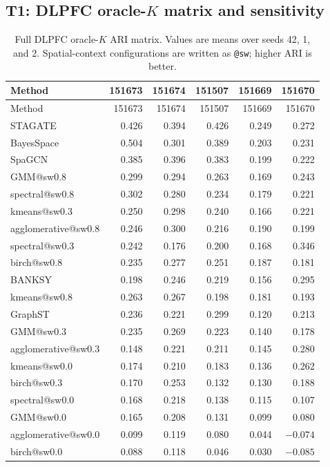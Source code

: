 \documentclass[11pt]{article}
\begin{document}
\subsection{T1: DLPFC oracle-\(K\) matrix and sensitivity}

\begin{longtable}{@{}lrrrrr@{}}
\caption{Full DLPFC oracle-\(K\) ARI matrix. Values are means over seeds
42, 1, and 2. Spatial-context configurations are written as
\texttt{@sw}; higher ARI is better.\label{tab:dlpfc-full}}\\
\toprule
Method & 151673 & 151674 & 151507 & 151669 & 151670 \\
\midrule
\endfirsthead
\toprule
Method & 151673 & 151674 & 151507 & 151669 & 151670 \\
\midrule
\endhead
STAGATE & 0.426 & 0.394 & 0.426 & 0.249 & 0.272 \\
BayesSpace & 0.504 & 0.301 & 0.389 & 0.203 & 0.231 \\
SpaGCN & 0.385 & 0.396 & 0.383 & 0.199 & 0.222 \\
GMM@sw0.8 & 0.299 & 0.294 & 0.263 & 0.169 & 0.243 \\
spectral@sw0.8 & 0.302 & 0.280 & 0.234 & 0.179 & 0.221 \\
kmeans@sw0.3 & 0.250 & 0.298 & 0.240 & 0.166 & 0.221 \\
agglomerative@sw0.8 & 0.246 & 0.300 & 0.216 & 0.190 & 0.199 \\
spectral@sw0.3 & 0.242 & 0.176 & 0.200 & 0.168 & 0.346 \\
birch@sw0.8 & 0.235 & 0.277 & 0.251 & 0.187 & 0.181 \\
BANKSY & 0.198 & 0.246 & 0.219 & 0.156 & 0.295 \\
kmeans@sw0.8 & 0.263 & 0.267 & 0.198 & 0.181 & 0.193 \\
GraphST & 0.236 & 0.221 & 0.299 & 0.120 & 0.213 \\
GMM@sw0.3 & 0.235 & 0.269 & 0.223 & 0.140 & 0.178 \\
agglomerative@sw0.3 & 0.148 & 0.221 & 0.211 & 0.145 & 0.280 \\
kmeans@sw0.0 & 0.174 & 0.210 & 0.183 & 0.136 & 0.262 \\
birch@sw0.3 & 0.170 & 0.253 & 0.132 & 0.130 & 0.188 \\
spectral@sw0.0 & 0.168 & 0.218 & 0.138 & 0.115 & 0.107 \\
GMM@sw0.0 & 0.165 & 0.208 & 0.131 & 0.099 & 0.080 \\
agglomerative@sw0.0 & 0.099 & 0.119 & 0.080 & 0.044 & $-0.074$ \\
birch@sw0.0 & 0.088 & 0.118 & 0.046 & 0.030 & $-0.085$ \\
\bottomrule
\end{longtable}
\end{document}
